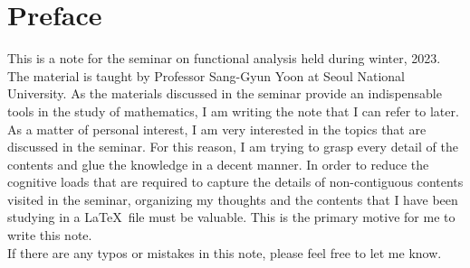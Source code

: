 \chapter*{Preface}
This is a note for the seminar on functional analysis held during winter, 2023. The material is taught by Professor Sang-Gyun Yoon at Seoul National University. As the materials discussed in the seminar provide an indispensable tools in the study of mathematics, I am writing the note that I can refer to later. \\[0.2cm]
As a matter of personal interest, I am very interested in the topics that are discussed in the seminar. For this reason, I am trying to grasp every detail of the contents and glue the knowledge in a decent manner. In order to reduce the cognitive loads that are required to capture the details of non-contiguous contents visited in the seminar, organizing my thoughts and the contents that I have been studying in a \LaTeX \ file must be valuable. This is the primary motive for me to write this note. \\[0.2cm]
If there are any typos or mistakes in this note, please feel free to let me know. 